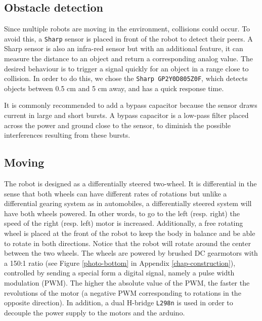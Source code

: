 \documentclass[12pt]{report}
\begin{document}
\subsection*{Obstacle detection}
Since multiple robots are moving in the environment, collisions could occur. To avoid this, a \texttt{Sharp} sensor is placed in front of the robot to detect their peers. A Sharp sensor is also an infra-red sensor but with an additional feature, it can measure the distance to an object and return a corresponding analog value. The desired behaviour is to trigger a signal quickly for an object in a range close to collision. In order to do this, we chose the \texttt{Sharp GP2Y0D805Z0F}, which detects objects between 0.5 cm and 5 cm away, and has a quick response time.

It is commonly recommended to add a bypass capacitor because the sensor draws current in large and short bursts. A bypass capacitor is a low-pass filter placed across the power and ground close to the sensor, to diminish the possible interferences resulting from these bursts.

\subsection*{Moving}
The robot is designed as a differentially steered two-wheel. It is differential in the sense that both wheels can have different rates of rotations but unlike a differential gearing system as in automobiles, a differentially steered system will have both wheels powered. In other words, to go to the left (resp. right) the speed of the right (resp. left) motor is increased. Additionally, a free rotating wheel is placed at the front of the robot to keep the body in balance and be able to rotate in both directions. Notice that the robot will rotate around the center between the two wheels. The wheels are powered by brushed DC gearmotors with a 150:1 ratio (see Figure \ref{photo-bottom} in Appendix \ref{chap-construction}), controlled by sending a special form a digital signal, namely a pulse width modulation (PWM). The higher the absolute value of the PWM, the faster the revolutions of the motor (a negative PWM corresponding to rotations in the opposite direction). In addition, a dual H-bridge \texttt{L298n} is used in order to decouple the power supply to the motors and the arduino. 
\end{document}
